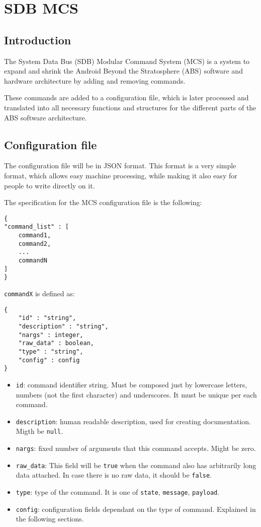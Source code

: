 \documentclass[12pt,a4paper]{report}
\begin{document}
\section*{SDB MCS}

\subsection*{Introduction}
The System Data Bus (SDB) Modular Command System (MCS) is a system to expand and shrink the Android Beyond the Stratosphere (ABS) software and hardware architecture by adding and removing commands.

These commands are added to a configuration file, which is later processed and translated into all necessary functions and structures for the different parts of the ABS software architecture.

\subsection*{Configuration file}
The configuration file will be in JSON format. This format is a very simple format, which allows easy machine processing, while making it also easy for people to write directly on it.

The specification for the MCS configuration file is the following:

\begin{lstlisting}
{
"command_list" : [
	command1,
	command2,
	...
	commandN
]
}
\end{lstlisting}

\texttt{commandX} is defined as:
\begin{lstlisting}
{
    "id" : "string",
    "description" : "string",
    "nargs" : integer,
    "raw_data" : boolean,
    "type" : "string",
    "config" : config
}
\end{lstlisting}

\begin{itemize}
\item \texttt{id}: command identifier string. Must be composed just by lowercase letters, numbers (not the first character) and underscores. It must be unique per each command.
\item \texttt{description}: human readable description, used for creating documentation. Migth be \texttt{null}.
\item \texttt{nargs}: fixed number of arguments that this command accepts. Might be zero.
\item \texttt{raw\_data}: This field will be \texttt{true} when the command also has arbitrarily long data attached. In case there is no raw data, it should be \texttt{false}.
\item \texttt{type}: type of the command. It is one of \texttt{state}, \texttt{message}, \texttt{payload}.
\item \texttt{config}: configuration fields dependant on the type of command. Explained in the following sections.
\end{itemize}
\end{document}
